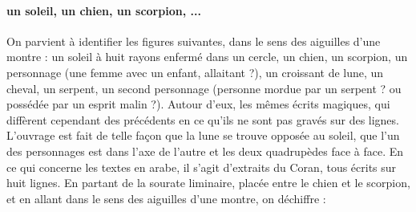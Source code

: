 \paragraph{un soleil, un chien, un scorpion, ...}On parvient à identifier les figures suivantes, dans le sens des aiguilles d'une montre : un soleil à huit rayons enfermé dans un cercle, un chien, un scorpion, un personnage (une femme avec un enfant, allaitant ?), un croissant de lune, un cheval, un serpent, un second personnage (personne mordue par un serpent ? ou possédée par un esprit malin ?). Autour d'eux, les mêmes écrits magiques, qui diffèrent cependant des précédents en ce qu'ils ne sont pas gravés sur des lignes.
L'ouvrage est fait de telle façon que la lune se trouve opposée au soleil, que l'un des personnages est dans l'axe de l'autre et les deux quadrupèdes face à face. En ce qui concerne les textes en arabe, il s'agit d'extraits du Coran, tous écrits sur huit lignes. En partant de la sourate liminaire, placée entre le chien et le scorpion, et en allant dans le sens des aiguilles d'une montre, on déchiffre :
